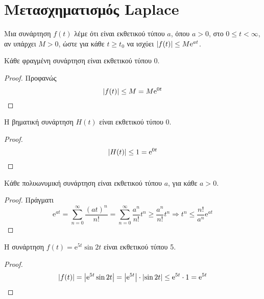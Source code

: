 



\pagestyle{vangelis}
\everymath{\displaystyle}

\renewcommand{\qedsymbol}{}



\chapter{Μετασχηματισμός Laplace}

\vspace{\baselineskip}


\begin{dfn}
  Μια συνάρτηση $ f(t) $ λέμε ότι είναι \textcolor{Col1}{εκθετικού τύπου $a$}, όπου 
  $a>0$, στο $ 0 \leq t < \infty $, αν υπάρχει $ M>0 $, ώστε για κάθε $ t \geq t_{0} $ 
  να ισχύει $ \abs{f(t)} \leq M \mathrm{e}^{at} $.
\end{dfn}

\begin{prop}
  Κάθε φραγμένη συνάρτηση είναι εκθετικού τύπου 0.
\end{prop}
\begin{proof}
  Προφανώς
  \[
    \abs{f(t)} \leq M = M \mathrm{e}^{0t}
  \] 
\end{proof}

\begin{example}
  Η βηματική συνάρτηση $ H(t) $ είναι εκθετικού τύπου 0.
  \begin{proof}
    \[
      \abs{H(t)} \leq 1 = \mathrm{e}^{0t} 
    \] 
  \end{proof}
\end{example}

\begin{prop}
  Κάθε πολυωνυμική συνάρτηση είναι εκθετικού τύπου $a$, για κάθε $ a>0 $.
\end{prop}
\begin{proof}
  Πράγματι
  \[
    \mathrm{e}^{at} = \sum_{n=0}^{\infty} \frac{(at)^{n}}{n!} = \sum_{n=0}^{\infty} 
    \frac{a^{n}}{n!} t^{n} \geq \frac{a^{n}}{n!} t^{n} \Rightarrow t^{n} \leq
    \frac{n!}{a^{n}} \mathrm{e}^{at}
  \]
\end{proof}

\begin{example}
  Η συνάρτηση $ f(t) = \mathrm{e}^{5t} \sin{2t} $ είναι εκθετικού τύπου 5.
  \begin{proof}
    \[
      \abs{f(t)} = \abs{\mathrm{e}^{5t} \sin{2t}} = \abs{\mathrm{e}^{5t}} \cdot 
      \abs{\sin{2t}} \leq \mathrm{e}^{5t} \cdot 1 = \mathrm{e}^{5t}
    \] 
  \end{proof}
\end{example}


